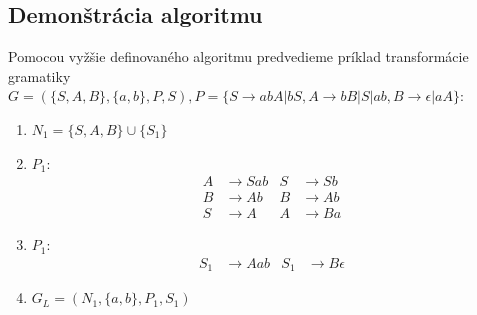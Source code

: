 \documentclass[10pt]{article}
\begin{document}
\subsection*{Demonštrácia algoritmu}
Pomocou vyžšie definovaného algoritmu predvedieme príklad transformácie gramatiky $G = (\{S,A,B\}, \{a, b\}, P, S),
P = \{S\to abA|bS, A\to bB|S|ab, B\to \epsilon | aA \}$:
\begin{enumerate}
    \item $N_1 = \{S, A, B\} \cup \{ S_1\}$
    \item $P_1$: 
            \begin{align*}
                A&\to Sab  & S&\to Sb\\
                B&\to Ab   & B&\to Ab\\
                S&\to A    & A&\to Ba
            \end{align*}
    \item $P_1$: 
            \begin{align*}
                S_1&\to Aab & S_1&\to B\epsilon
            \end{align*}
    \item $G_L = (N_1, \{a,b\}, P_1, S_1)$

\end{enumerate}
\end{document}
